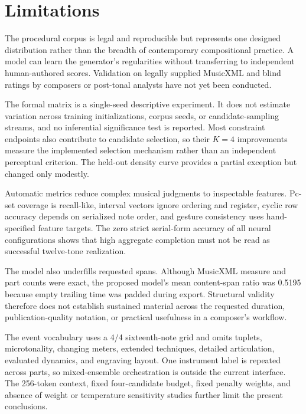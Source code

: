 \section{Limitations}
\label{sec:limitations}

The procedural corpus is legal and reproducible but represents one designed distribution rather than the breadth of contemporary compositional practice. A model can learn the generator's regularities without transferring to independent human-authored scores. Validation on legally supplied MusicXML and blind ratings by composers or post-tonal analysts have not yet been conducted.

The formal matrix is a single-seed descriptive experiment. It does not estimate variation across training initializations, corpus seeds, or candidate-sampling streams, and no inferential significance test is reported. Most constraint endpoints also contribute to candidate selection, so their $K=4$ improvements measure the implemented selection mechanism rather than an independent perceptual criterion. The held-out density curve provides a partial exception but changed only modestly.

Automatic metrics reduce complex musical judgments to inspectable features. Pc-set coverage is recall-like, interval vectors ignore ordering and register, cyclic row accuracy depends on serialized note order, and gesture consistency uses hand-specified feature targets. The zero strict serial-form accuracy of all neural configurations shows that high aggregate completion must not be read as successful twelve-tone realization.

The model also underfills requested spans. Although MusicXML measure and part counts were exact, the proposed model's mean content-span ratio was 0.5195 because empty trailing time was padded during export. Structural validity therefore does not establish sustained material across the requested duration, publication-quality notation, or practical usefulness in a composer's workflow.

The event vocabulary uses a 4/4 sixteenth-note grid and omits tuplets, microtonality, changing meters, extended techniques, detailed articulation, evaluated dynamics, and engraving layout. One instrument label is repeated across parts, so mixed-ensemble orchestration is outside the current interface. The 256-token context, fixed four-candidate budget, fixed penalty weights, and absence of weight or temperature sensitivity studies further limit the present conclusions.
